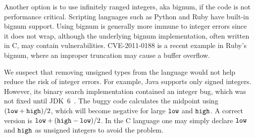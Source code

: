 Another option is to use infinitely ranged integers, aka bignum,
if the code is not performance critical.  Scripting languages such
as Python and Ruby have built-in bignum support.  Using bignum is
generally more immune to integer errors since it does not wrap,
although the underlying bignum implementation, often written in C,
may contain vulnerabilities.  CVE-2011-0188 is a recent example in
Ruby's bignum, where an improper truncation may cause a buffer
overflow.
%

We suspect that removing unsigned types from the language would
not help reduce the risk of integer errors.  For example, Java
supports only signed integers.  However, its binary search
implementation contained an integer bug, which was not fixed until
JDK~6~\cite{java-bsearch}.  The buggy code calculates the midpoint
using $(\texttt{low} + \texttt{high})/2$, which will become negative for
large $\texttt{low}$ and $\texttt{high}$.  A correct version is $\texttt{low}
+ (\texttt{high}-\texttt{low})/2$.  In the C language one may simply declare
$\texttt{low}$ and $\texttt{high}$ as unsigned integers to avoid the problem.


